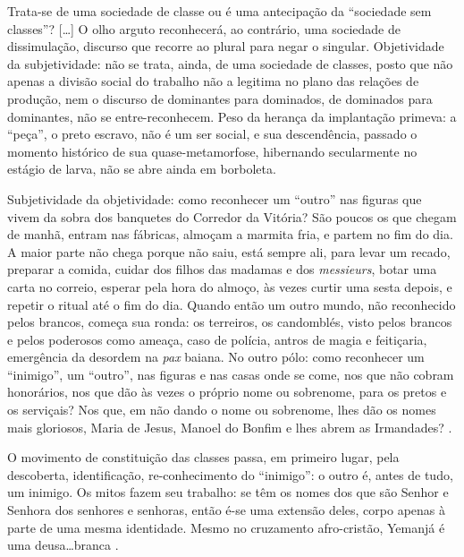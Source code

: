 \begin{citacao}
Trata-se de uma sociedade de classe ou é uma antecipação da ``sociedade sem classes''? [\dots] O olho arguto reconhecerá, ao contrário, uma sociedade de dissimulação, discurso que recorre ao plural para negar o singular. Objetividade da subjetividade: não se trata, ainda, de uma sociedade de classes, posto que não apenas a divisão social do trabalho não a legitima no plano das relações de produção, nem o discurso de dominantes para dominados, de dominados para dominantes, não se entre-reconhecem. Peso da herança da implantação primeva: a ``peça'', o preto escravo, não é um ser social, e sua descendência, passado o momento histórico de sua quase-metamorfose, hibernando secularmente no estágio de larva, não se abre ainda em borboleta.

Subjetividade da objetividade: como reconhecer um ``outro'' nas figuras que vivem da sobra dos banquetes do Corredor da Vitória? São poucos os que chegam de manhã, entram nas fábricas, almoçam a marmita fria, e partem no fim do dia. A maior parte não chega porque não saiu, está sempre ali, para levar um recado, preparar a comida, cuidar dos filhos das madamas e dos \textit{messieurs}, botar uma carta no correio, esperar pela hora do almoço, às vezes curtir uma sesta depois, e repetir o ritual até o fim do dia. Quando então um outro mundo, não reconhecido pelos brancos, começa sua ronda: os terreiros, os candomblés, visto pelos brancos e pelos poderosos como ameaça, caso de polícia, antros de magia e feitiçaria, emergência da desordem na \textit{pax} baiana. No outro pólo: como reconhecer um ``inimigo'', um ``outro'', nas figuras e nas casas onde se come, nos que não cobram honorários, nos que dão às vezes o próprio nome ou sobrenome, para os pretos e os serviçais? Nos que, em não dando o nome ou sobrenome, lhes dão os nomes mais gloriosos, Maria de Jesus, Manoel do Bonfim e lhes abrem as Irmandades? \cite[p.~36-37]{OLIVEIRA1987}.
\end{citacao}

\begin{citacao}
O movimento de constituição das classes passa, em primeiro lugar, pela descoberta, identificação, re-conhecimento do ``inimigo'': o outro é, antes de tudo, um inimigo. Os mitos fazem seu trabalho: se têm os nomes dos que são Senhor e Senhora dos senhores e senhoras, então é-se uma extensão deles, corpo apenas à parte de uma mesma identidade. Mesmo no cruzamento afro-cristão, Yemanjá é uma deusa\dots branca \cite[p.~37]{OLIVEIRA1987}.
\end{citacao}

